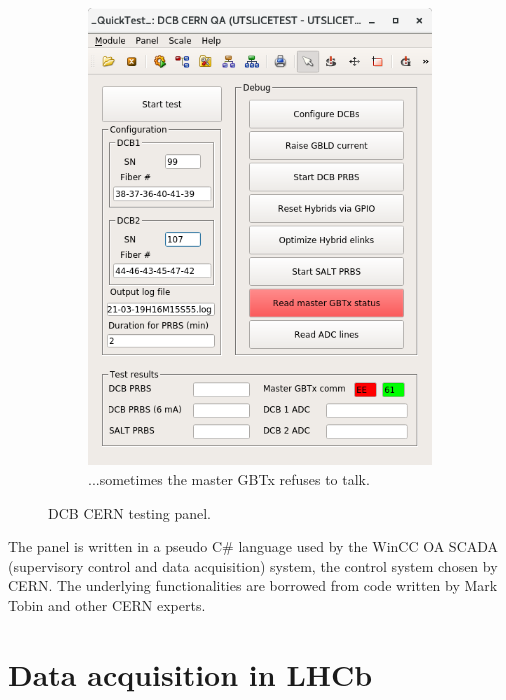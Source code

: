 \begin{figure}[!htb]
\begin{subfigure}[t]{0.4\textwidth}
        \includegraphics[width=\textwidth]{./figs-ut-upgrade/dcb/dcb_cern_panel_2.png}
        \caption{
            ...sometimes the master GBTx refuses to talk.
        }
    \end{subfigure}

    \caption{
        DCB CERN testing panel.
    }
    \label{fig:dcb-cern-test-panel}
\end{figure}

The panel is written in a pseudo C\# language used by the WinCC OA
SCADA (supervisory control and data acquisition) system,
the control system chosen by CERN.
The underlying functionalities are borrowed from code written by Mark Tobin
and other CERN experts.


\section{Data acquisition in LHCb}
\label{ref:ut:daq}


